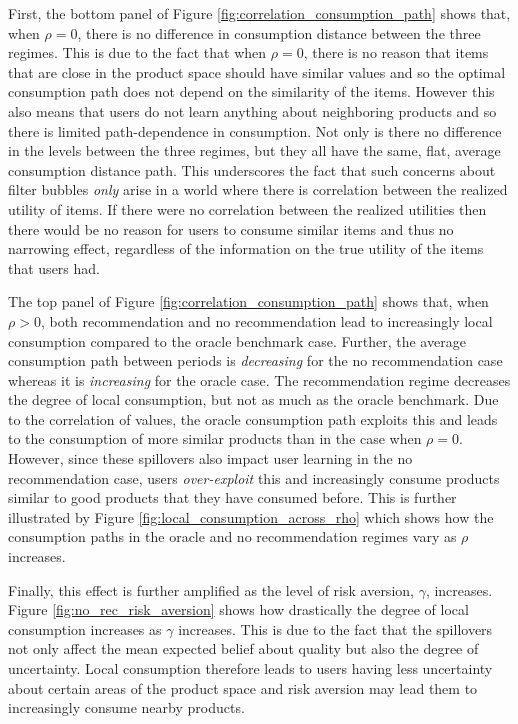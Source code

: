\documentclass[format=acmsmall, review=false]{acmart}
\begin{document}
First, the bottom panel of Figure \ref{fig:correlation_consumption_path} shows that, when $\rho = 0$, there is no difference in consumption distance between the three regimes. This is due to the fact that when $\rho = 0$, there is no reason that items that are close in the product space should have similar values and so the optimal consumption path does not depend on the similarity of the items. However this also means that users do not learn anything about neighboring products and so there is limited path-dependence in consumption. Not only is there no difference in the levels between the three regimes, but they all have the same, flat, average consumption distance path. This underscores the fact that such concerns about filter bubbles \textit{only} arise in a world where there is correlation between the realized utility of items. If there were no correlation between the realized utilities then there would be no reason for users to consume similar items and thus no narrowing effect, regardless of the information on the true utility of the items that users had.
\par
The top panel of Figure \ref{fig:correlation_consumption_path} shows that, when $\rho > 0$, both recommendation and no recommendation lead to increasingly local consumption compared to the oracle benchmark case. Further, the average consumption path between periods is \textit{decreasing} for the no recommendation case whereas it is \textit{increasing} for the oracle case. The recommendation regime decreases the degree of local consumption, but not as much as the oracle benchmark. Due to the correlation of values, the oracle consumption path exploits this and leads to the consumption of more similar products than in the case when $\rho = 0$. However, since these spillovers also impact user learning in the no recommendation case, users \textit{over-exploit} this and increasingly consume products similar to good products that they have consumed before. This is further illustrated by Figure \ref{fig:local_consumption_across_rho} which shows how the consumption paths in the oracle and no recommendation regimes vary as $\rho$ increases.
\par

Finally, this effect is further amplified as the level of risk aversion, $\gamma$, increases. Figure \ref{fig:no_rec_risk_aversion} shows how drastically the degree of local consumption increases as $\gamma$ increases. This is due to the fact that the spillovers not only affect the mean expected belief about quality but also the degree of uncertainty. Local consumption therefore leads to users having less uncertainty about certain areas of the product space and risk aversion may lead them to increasingly consume nearby products.
\end{document}
